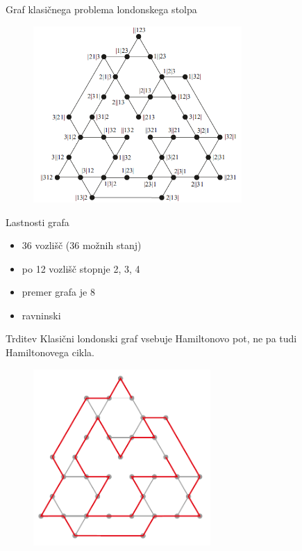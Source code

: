 \documentclass[dvipsnames]{beamer}
\begin{document}
\begin{frame}{Graf klasičnega problema londonskega stolpa}
    
    \begin{figure}
        \centering
        \includegraphics[height=190pt]{../img/tolgraph.png}
    \end{figure}
\end{frame}


\begin{frame}{Lastnosti grafa}
    \begin{itemize}
        \item 36 vozlišč (36 možnih stanj)
        \item po 12 vozlišč stopnje 2, 3, 4
        \item premer grafa je 8
        \item ravninski
    \end{itemize}
   	\begin{block}{Trditev}
   		Klasični londonski graf vsebuje Hamiltonovo pot, ne pa tudi Hamiltonovega cikla.
   	\end{block}
\end{frame}

\begin{frame}
    \begin{figure}
        \centering
        \includegraphics[height=190pt]{../img/tolgraph-ham-path.png}
    \end{figure}
\end{frame}
\end{document}
